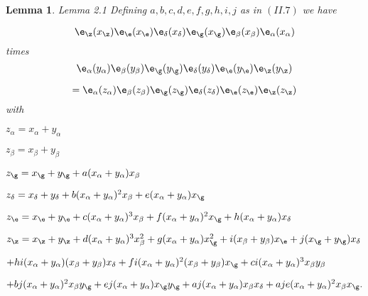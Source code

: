 \documentclass{memo-l}
\newtheorem{lemma}[theorem]{Lemma}
\theoremstyle{definition}
\theoremstyle{remark}
\numberwithin{section}{chapter}
\numberwithin{equation}{chapter}
\begin{document}
\begin{lemma}{Lemma 2.1}   Defining $a,b,c,d,e,f,g,h,i,j$ as in $(II.7)$ we have

$${\e}_{{\z}}(x_{{\z}}){\e}_{{\e}}(x_{{\e}})
{\e}_{{\delta}}(x_{{\delta}}){\e}_{{\g}}(x_{{\g}})
{\e}_{\beta}(x_{\beta}){\e}_{\alpha}(x_{\alpha})
$$  times      $$ {\e}_{\alpha}(y_{{\alpha }}){\e}_{\beta}(y_{\beta})
{\e}_{{\g}}(y_{{\g}}){\e}_{{\delta}}(y_{{\delta}})
{\e}_{{\e}}(y_{{\e}}){\e}_{{\z}}(y_\z)$$

$$
= {\e}_{\alpha}(z_{\alpha}){\e}_{\beta}(z_{\beta})
{\e}_{{\g}}(z_{{\g}}){\e}_{{\delta}}(z_{{\delta}})
{\e}_{{\e}}(z_{{\e}}){\e}_{{\z}}(z_{{\z}})
$$ 
with

\noindent
$z_{\alpha} = x_{\alpha}+y_{\alpha}$

\noindent
$z_{\beta} = x_{\beta}+y_{\beta}$

\noindent
$z_{{\g}} = x_{{\g}}+y_{{\g}} + a(x_{\alpha}+y_{\alpha})
x_{\beta}$

\noindent
$z_{{\delta}} = x_{{\delta}}+y_{{\delta}} + b(x_{\alpha}+y_{\alpha})^{2}
x_{\beta} + e(x_{\alpha}+y_{\alpha})x_{{\g}}$

\noindent
$z_{{\e}} = x_{{\e}}+y_{{\e}} + c(x_{\alpha}+
y_{\alpha})^{3}x_{\beta} + f(x_{\alpha}+y_{\alpha})^{2}x_{{\g}} + 
h(x_{\alpha}+y_{\alpha})x_{{\delta}}$

\noindent
$z_{{\z}} = x_{{\z}}+y_{{\z}} + d(x_{\alpha}+y_{\alpha})^{3}
x_{\beta}^{2} + g(x_{\alpha}+y_{\alpha})x_{{\g}}^{2} + i(x_{\beta}
+y_{\beta})x_{{\e}} + j(x_{{\g}}+y_{{\g}})x_{{\delta}}$

   $+ hi(x_{\alpha}+y_{\alpha})(x_{\beta}+y_{\beta})x_{{\delta}} + 
fi(x_{\alpha}+y_{\alpha})^{2}(x_{\beta}+y_{\beta})x_{{\g}} + 
ci(x_{\alpha}+y_{\alpha})^{3}x_{\beta}y_{\beta}$ 

   $+ bj(x_{\alpha}+y_{\alpha})^{2}x_{\beta}y_{{\g}} + 
ej(x_{\alpha}+y_{\alpha})x_{{\g}}y_{{\g}} + aj(x_{\alpha}+
y_{\alpha})x_{\beta}x_{{\delta}} + aje(x_{\alpha}+y_{\alpha})^{2}
x_{\beta}x_{{\g}}.$
\end{lemma}
\end{document}
